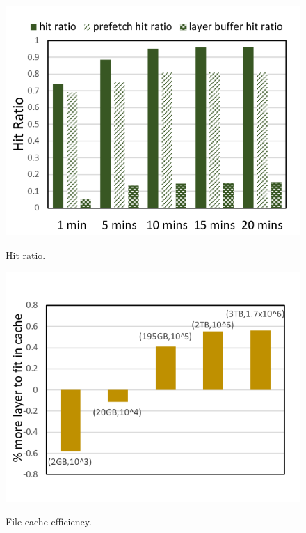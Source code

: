 \begin{figure}[t]
	\centering
		\begin{minipage}{0.225\textwidth}
			\centering
			\includegraphics[width=1\textwidth]{graphs/evaluation_hitratios.png}
			\caption{Hit ratio.}
			\label{fig:hitratio}
		\end{minipage}
	\begin{minipage}{0.25\textwidth}
		\centering
		\includegraphics[width=1\textwidth]{graphs/percentage_morelayers_afterdedup.png}
		\caption{File cache efficiency.}
		\vspace{-3pt}
		\label{fig:cacheefficiency}
	\end{minipage}
\end{figure}